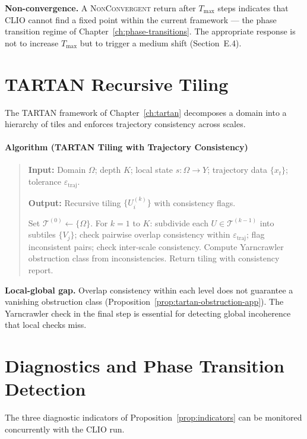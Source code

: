 \documentclass[11pt,openany]{book}
\begin{document}
\textbf{Non-convergence.} A \textsc{NonConvergent} return
after $T_{\max}$ steps indicates that CLIO cannot find a
fixed point within the current framework — the phase
transition regime of Chapter~\ref{ch:phase-transitions}.
The appropriate response is not to increase $T_{\max}$
but to trigger a medium shift (Section~E.4).

\section{TARTAN Recursive Tiling}
\label{sec:tartan-impl}

The TARTAN framework of Chapter~\ref{ch:tartan} decomposes
a domain into a hierarchy of tiles and enforces trajectory
consistency across scales.


\paragraph{Algorithm (TARTAN Tiling with Trajectory Consistency)}\label{alg:tartan}

\begin{quote}
\textbf{Input:} Domain $\Omega$; depth $K$; local state $s : \Omega \to Y$; trajectory data $\{x_t\}$; tolerance $\varepsilon_{\mathrm{traj}}$.

\textbf{Output:} Recursive tiling $\{U_i^{(k)}\}$ with consistency flags.

Set $\mathcal{T}^{(0)} \gets \{\Omega\}$. For $k = 1$ to $K$: subdivide each $U \in \mathcal{T}^{(k-1)}$ into subtiles $\{V_j\}$; check pairwise overlap consistency within $\varepsilon_{\mathrm{traj}}$; flag inconsistent pairs; check inter-scale consistency. Compute Yarncrawler obstruction class from inconsistencies. Return tiling with consistency report.
\end{quote}


\textbf{Local-global gap.} Overlap consistency within each
level does not guarantee a vanishing obstruction class
(Proposition~\ref{prop:tartan-obstruction-app}).  The
Yarncrawler check in the final step is essential for
detecting global incoherence that local checks miss.

\section{Diagnostics and Phase Transition Detection}
\label{sec:diagnostics}

The three diagnostic indicators of
Proposition~\ref{prop:indicators} can be monitored
concurrently with the CLIO run.
\end{document}
